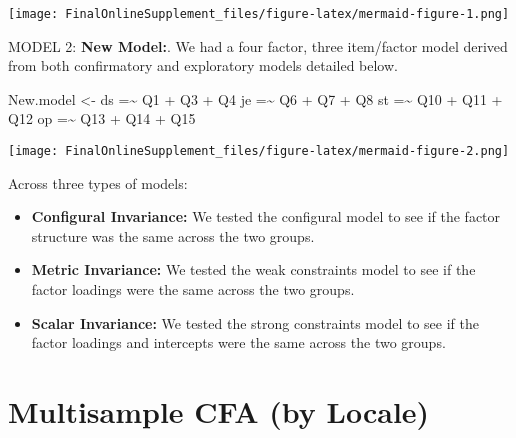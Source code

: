 \documentclass[
  letterpaper,
  DIV=11,
  numbers=noendperiod]{scrartcl}
\newenvironment{Shaded}{\begin{snugshade}}{\end{snugshade}}
\newcommand{\NormalTok}[1]{\textcolor[rgb]{0.00,0.23,0.31}{#1}}
\newcommand{\OtherTok}[1]{\textcolor[rgb]{0.00,0.23,0.31}{#1}}
\newcommand{\StringTok}[1]{\textcolor[rgb]{0.13,0.47,0.30}{#1}}
\providecommand{\tightlist}{%
  \setlength{\itemsep}{0pt}\setlength{\parskip}{0pt}}\usepackage{longtable,booktabs,array}
\begin{document}
\texttt{[image: FinalOnlineSupplement\_files/figure-latex/mermaid-figure-1.png]}

MODEL 2: \textbf{New Model:}. We had a four factor, three item/factor
model derived from both confirmatory and exploratory models detailed
below.

\begin{Shaded}
\begin{Highlighting}[]
\NormalTok{New.model }\OtherTok{\textless{}{-}} \StringTok{\textquotesingle{}ds =\textasciitilde{} Q1 + Q3 + Q4}
\StringTok{              je =\textasciitilde{} Q6 + Q7 + Q8}
\StringTok{              st =\textasciitilde{} Q10 + Q11 + Q12}
\StringTok{              op =\textasciitilde{} Q13 + Q14 + Q15\textquotesingle{}}
\end{Highlighting}
\end{Shaded}

\texttt{[image: FinalOnlineSupplement\_files/figure-latex/mermaid-figure-2.png]}

Across three types of models:

\begin{itemize}
\tightlist
\item
  \textbf{Configural Invariance:} We tested the configural model to see
  if the factor structure was the same across the two groups.\\
\item
  \textbf{Metric Invariance:} We tested the weak constraints model to
  see if the factor loadings were the same across the two groups.
\item
  \textbf{Scalar Invariance:} We tested the strong constraints model to
  see if the factor loadings and intercepts were the same across the two
  groups.
\end{itemize}

\section{Multisample CFA (by Locale)}\label{multisample-cfa-by-locale}
\end{document}

